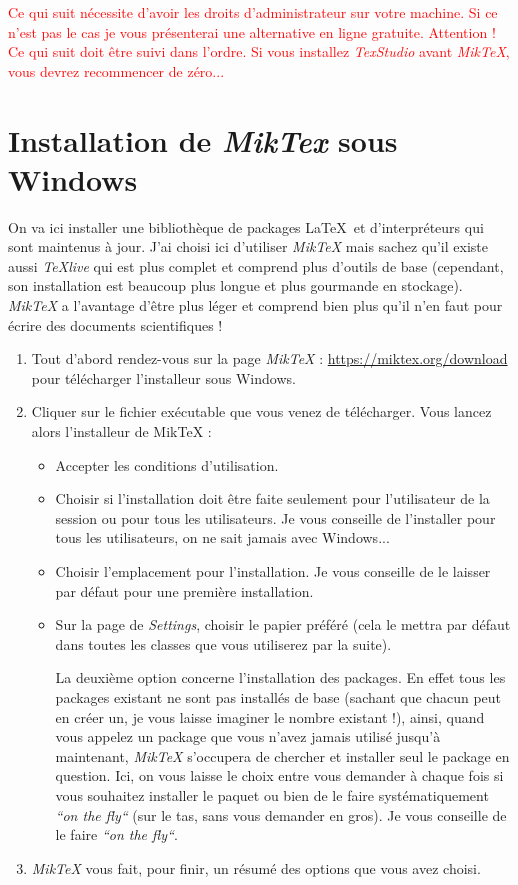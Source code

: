 \documentclass[11pt,a4paper]{article} %
\begin{document}
\textcolor{red}{Ce qui suit nécessite d'avoir les droits d'administrateur sur votre machine. Si ce n'est pas le cas je vous présenterai une alternative en ligne gratuite. Attention ! Ce qui suit doit être suivi dans l'ordre. Si vous installez \textit{TexStudio} avant \textit{MikTeX}, vous devrez recommencer de zéro...}

\section{Installation de \textit{MikTex} sous Windows}
On va ici installer une bibliothèque de packages \LaTeX\ et d'interpréteurs qui sont maintenus à jour. J'ai choisi ici d'utiliser \textit{MikTeX} mais sachez qu'il existe aussi \textit{TeXlive} qui est plus complet et comprend plus d'outils de base (cependant, son installation est beaucoup plus longue et plus gourmande en stockage). \textit{MikTeX} a l'avantage d'être plus léger et comprend bien plus qu'il n'en faut pour écrire des documents scientifiques !

\begin{enumerate}
	\item Tout d'abord rendez-vous sur la page \textit{MikTeX} : \url{https://miktex.org/download} pour télécharger l'installeur sous Windows.
	\item Cliquer sur le fichier exécutable que vous venez de télécharger. Vous lancez alors l'installeur de MikTeX :
	\begin{itemize}
		\item Accepter les conditions d'utilisation.
		\item Choisir si l'installation doit être faite seulement pour l'utilisateur de la session ou pour tous les utilisateurs. Je vous conseille de l'installer pour tous les utilisateurs, on ne sait jamais avec Windows...
		\item Choisir l'emplacement pour l'installation. Je vous conseille de le laisser par défaut pour une première installation.
		\item Sur la page de \textit{Settings}, choisir le papier préféré (cela le mettra par défaut dans toutes les classes que vous utiliserez par la suite).
		
		La deuxième option concerne l'installation des packages. En effet tous les packages existant ne sont pas installés de base (sachant que chacun peut en créer un, je vous laisse imaginer le nombre existant !), ainsi, quand vous appelez un package que vous n'avez jamais utilisé jusqu'à maintenant, \textit{MikTeX} s'occupera de chercher et installer seul le package en question. Ici, on vous laisse le choix entre vous demander à chaque fois si vous souhaitez installer le paquet ou bien de le faire systématiquement \textit{``on the fly``} (sur le tas, sans vous demander en gros). Je vous conseille de le faire \textit{``on the fly``}.
	\end{itemize}
		\item \textit{MikTeX} vous fait, pour finir, un résumé des options que vous avez choisi.
\end{enumerate}
\end{document}
